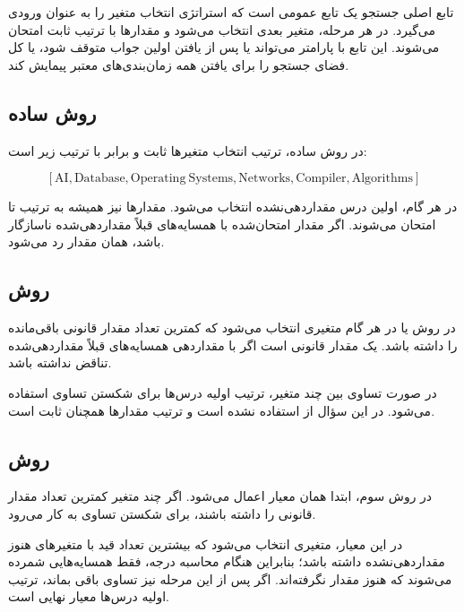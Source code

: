 \documentclass[10.5pt]{exam}
\begin{document}
تابع اصلی جستجو
یک تابع عمومی است که استراتژی انتخاب متغیر را به عنوان ورودی می‌گیرد.
در هر مرحله، متغیر بعدی انتخاب می‌شود و مقدارها با ترتیب ثابت
امتحان می‌شوند. این تابع با پارامتر
می‌تواند یا پس از یافتن اولین جواب متوقف شود، یا کل فضای جستجو را برای یافتن همه زمان‌بندی‌های معتبر پیمایش کند.

\subsection*{روش  ساده}

در روش ساده، ترتیب انتخاب متغیرها ثابت و برابر با ترتیب زیر است:

\[
[\mathrm{AI},\mathrm{Database},\mathrm{Operating\ Systems},\mathrm{Networks},\mathrm{Compiler},\mathrm{Algorithms}]
\]

در هر گام، اولین درس مقداردهی‌نشده انتخاب می‌شود. مقدارها نیز همیشه به ترتیب
تا
امتحان می‌شوند. اگر مقدار امتحان‌شده با همسایه‌های قبلاً مقداردهی‌شده ناسازگار باشد، همان مقدار رد می‌شود.

\subsection*{روش }

در روش
یا
در هر گام متغیری انتخاب می‌شود که کمترین تعداد مقدار قانونی باقی‌مانده را داشته باشد.
یک مقدار قانونی است اگر با مقداردهی همسایه‌های قبلاً مقداردهی‌شده تناقض نداشته باشد.

در صورت تساوی بین چند متغیر، ترتیب اولیه درس‌ها برای شکستن تساوی استفاده می‌شود.
در این سؤال از
استفاده نشده است و ترتیب مقدارها همچنان ثابت است.

\subsection*{روش }

در روش سوم، ابتدا همان معیار
اعمال می‌شود. اگر چند متغیر کمترین تعداد مقدار قانونی را داشته باشند،
برای شکستن تساوی به کار می‌رود.

در این معیار، متغیری انتخاب می‌شود که بیشترین تعداد قید با متغیرهای هنوز مقداردهی‌نشده داشته باشد؛
بنابراین هنگام محاسبه درجه، فقط همسایه‌هایی شمرده می‌شوند که هنوز مقدار نگرفته‌اند.
اگر پس از این مرحله نیز تساوی باقی بماند، ترتیب اولیه درس‌ها معیار نهایی است.
\end{document}
